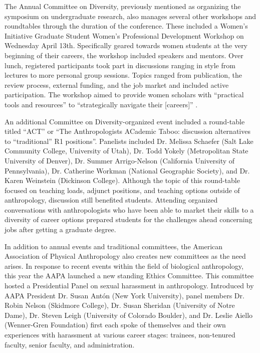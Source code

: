 \documentclass[english]{ijsra}
\begin{document}
The  Annual Committee on Diversity, 
previously mentioned as organizing the symposium on undergraduate research, 
also manages several other workshops and roundtables through the duration of the conference.
These included a Women's Initiative Graduate Student Women's Professional Development Workshop on Wednesday April 13th. 
Specifically geared towards women students at the very beginning of their careers, the workshop included speakers and mentors.
Over lunch, registered participants took part in discussions ranging in style from lectures to more personal group sessions.
Topics ranged from publication, the review process, external funding, and the job market and included active participation.
The workshop aimed to provide women scholars with “practical tools and resources” to “strategically navigate their [careers]” \parencite{american association of physical anthropologists_2015}.

An additional Committee on Diversity-organized event included a round-table titled “ACT” or
“The Anthropologists ACademic Taboo: discussion alternatives to “traditional” R1 positions”.
Panelists included Dr. Melissa Schaefer (Salt Lake Community College, University of Utah),
Dr. Todd Yokely (Metropolitan State University of Denver), Dr. Summer Arrigo-Nelson (California University of Pennsylvania),
Dr. Catherine Workman (National Geographic Society), and Dr. Karen Weinstein (Dickinson College).
Although the topic of this round-table focused on teaching loads, adjunct positions, and teaching options outside of anthropology,
discussion still benefited students.  
Attending organized conversations with anthropologists who have been able to market their skills to a diversity of career options
prepared students for the challenges ahead concerning jobs after getting a graduate degree.

In addition to annual events and traditional committees,
the American Association of Physical Anthropology also creates new committees as the need arises. 
In response to recent events within the field of biological anthropology, this year the AAPA launched a new standing Ethics Committee.
This committee hosted a Presidential Panel on sexual harassment in anthropology.
Introduced by AAPA President Dr. Susan Antón (New York University), panel members Dr. Robin Nelson (Skidmore College),
Dr. Susan Sheridan (University of Notre Dame), Dr. Steven Leigh (University of Colorado Boulder),
and Dr. Leslie Aiello (Wenner-Gren Foundation) first each spoke of themselves and
their own experiences with harassment at various career stages: trainees, non-tenured faculty, senior faculty, and administration.
\end{document}
